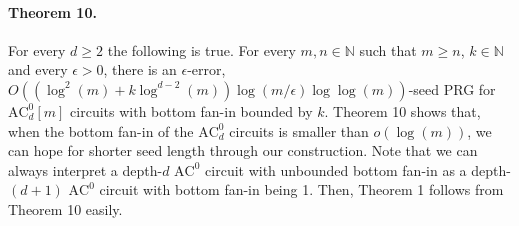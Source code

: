 \paragraph{Theorem 10.} For every $d\ge2$ the following is true. For every $m,n\in\mathbb N$ such that $m\ge n$, $k\in\mathbb N$ and every $\epsilon>0$, there is an $\epsilon$-error, $O((\log^2(m)+k\log^{d-2}(m))\log(m/\epsilon)\log\log(m))$-seed PRG for $\mathrm{AC}^0_d[m]$ circuits with bottom fan-in bounded by $k$.
Theorem 10 shows that, when the bottom fan-in of the $\mathrm{AC}^0_d$ circuits is smaller than $o(\log(m))$, we can hope for shorter seed length through our construction. Note that we can always interpret a depth-$d$ $\mathrm{AC}^0$ circuit with unbounded bottom fan-in as a depth-$(d+1)$ $\mathrm{AC}^0$ circuit with bottom fan-in being 1. Then, Theorem 1 follows from Theorem 10 easily.
